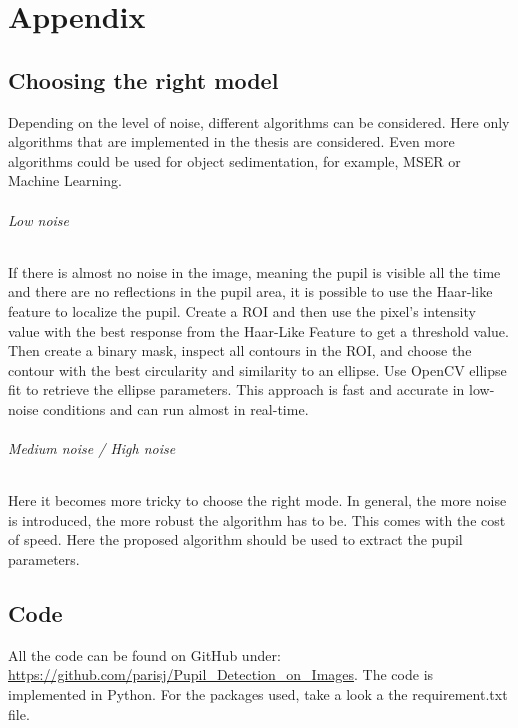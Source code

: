 \chapter{Appendix}
\label{appendix}
\section{Choosing the right model}
Depending on the level of noise, different algorithms can be considered. Here only algorithms that are implemented in the thesis are considered. Even more algorithms could be used for object sedimentation, for example, MSER or Machine Learning. 
\subparagraph{Low noise}
If there is almost no noise in the image, meaning the pupil is visible all the time and there are no reflections in the pupil area, it is possible to use the Haar-like feature to localize the pupil. Create a ROI and then use the pixel's intensity value with the best response from the Haar-Like Feature to get a threshold value. Then create a binary mask, inspect all contours in the ROI, and choose the contour with the best circularity and similarity to an ellipse. Use OpenCV ellipse fit to retrieve the ellipse parameters. This approach is fast and accurate in low-noise conditions and can run almost in real-time. 
\subparagraph{Medium noise / High noise}
Here it becomes more tricky to choose the right mode. In general, the more noise is introduced, the more robust the algorithm has to be. This comes with the cost of speed. Here the proposed algorithm should be used to extract the pupil parameters. 

\section{Code}
All the code can be found on GitHub under: \url{https://github.com/parisj/Pupil_Detection_on_Images}. The code is implemented in Python. For the packages used, take a look a the requirement.txt file.
